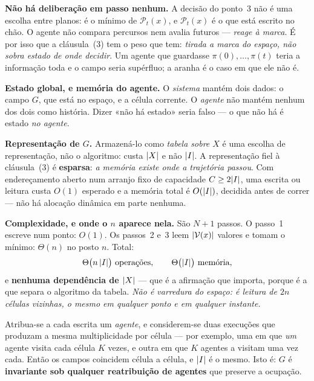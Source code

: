\documentclass[livro.tex]{subfiles}
\begin{document}
\medskip\noindent\textbf{Não há deliberação em passo nenhum.} A decisão do
ponto~3 não é uma escolha entre planos: é o mínimo de $\mathcal{P}_t(x)$, e
$\mathcal{P}_t(x)$ é o que está escrito no chão. O agente não compara percursos
nem avalia futuros --- \emph{reage à marca}. É por isso que a cláusula~(3) tem o
peso que tem: \emph{tirada a marca do espaço, não sobra estado de onde decidir}.
Um agente que guardasse $\pi(0),\dots,\pi(t)$ teria a informação toda e o campo
seria supérfluo; a aranha é o caso em que ele não é.

\medskip\noindent\textbf{Estado global, e memória do agente.} O \emph{sistema}
mantém dois dados: o campo $G$, que está no espaço, e a célula corrente. O
\emph{agente} não mantém nenhum dos dois como história. Dizer «não há estado»
seria falso --- o que não há é estado \emph{no agente}.

\medskip\noindent\textbf{Representação de $G$.} Armazená-lo como \emph{tabela
sobre $X$} é uma escolha de representação, não o algoritmo: custa $\lvert X\rvert$ e não
$\lvert I\rvert$. A representação fiel à cláusula~(3) é \textbf{esparsa}: \emph{a memória
existe onde a trajetória passou}. Com endereçamento aberto num arranjo fixo de
capacidade $C\ge2\lvert I\rvert$, uma escrita ou leitura custa $O(1)$ esperado e a
memória total é $O(\lvert I\rvert)$, decidida antes de correr --- não há alocação
dinâmica em parte nenhuma.

\medskip\noindent\textbf{Complexidade, e onde o $n$ aparece nela.} São $N+1$
passos. O passo~1 escreve num ponto: $O(1)$. Os passos~2 e~3 leem
$\lvert \mathcal{V}(x)\rvert$ valores e tomam o mínimo: $\Theta(n)$ no posto $n$. Total:
\[
\Theta\bigl(n\,\abs{I}\bigr)\ \text{operações},\qquad
\Theta\bigl(\abs{I}\bigr)\ \text{memória},
\]
e \textbf{nenhuma dependência de $\lvert X\rvert$} --- que é a afirmação que importa,
porque é a que separa o algoritmo da tabela. \emph{Não é varredura do espaço: é
leitura de $2n$ células vizinhas, o mesmo em qualquer ponto e em qualquer
instante.}

\begin{teorema}\label{fis:thm:agentes}
Atribua-se a cada escrita um \emph{agente}, e considerem-se duas execuções que
produzam a mesma multiplicidade por célula --- por exemplo, uma em que \emph{um}
agente visita cada célula $K$ vezes, e outra em que $K$ agentes a visitam uma vez
cada. Então os campos coincidem célula a célula, e $\lvert I\rvert$ é o mesmo. Isto é:
$G$ é \textbf{invariante sob qualquer reatribuição de agentes} que preserve a
ocupação.
\end{teorema}
\end{document}
